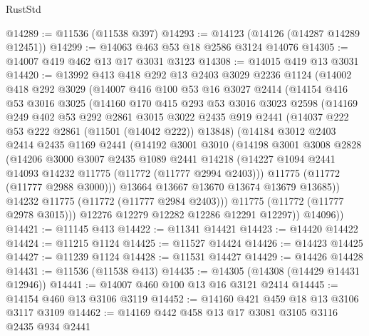 \begin{lexlean}{RustStd}
\begin{coremodule}
@14289 := @11536 (@11538 @397)
@14293 := @14123 (@14126 (@14287 @14289 @12451))
@14299 := @14063 @463 @53 @18 @2586 @3124 @14076
@14305 := @14007 @419 @462 @13 @17 @3031 @3123
@14308 := @14015 @419 @13 @3031
@14420 := @13992
    @413
    @418
    @292
    @13
    @2403
    @3029
    @2236
    @1124
    (@14002
      @418
      @292
      @3029
      (@14007
        @416
        @100
        @53
        @16
        @3027
        @2414
        (@14154
          @416
          @53
          @3016
          @3025
          (@14160
            @170
            @415
            @293
            @53
            @3016
            @3023
            @2598
            (@14169
              @249
              @402
              @53
              @292
              @2861
              @3015
              @3022
              @2435
              @919
              @2441
              (@14037 @222 @53 @222 @2861 (@11501 (@14042 @222)) @13848)
              (@14184
                @3012
                @2403
                @2414
                @2435
                @1169
                @2441
                (@14192
                  @3001
                  @3010
                  (@14198
                    @3001
                    @3008
                    @2828
                    (@14206
                      @3000
                      @3007
                      @2435
                      @1089
                      @2441
                      @14218
                      (@14227 @1094 @2441 @14093 @14232 @11775 (@11772 (@11777 @2994 @2403)))
                      @11775
                      (@11772 (@11777 @2988 @3000)))
                    @13664
                    @13667
                    @13670
                    @13674
                    @13679
                    @13685))
                @14232
                @11775
                (@11772 (@11777 @2984 @2403)))
              @11775
              (@11772 (@11777 @2978 @3015)))
            @12276
            @12279
            @12282
            @12286
            @12291
            @12297))
        @14096))
@14421 := @11145 @413
@14422 := @11341 @14421
@14423 := @14420 @14422
@14424 := @11215 @1124
@14425 := @11527 @14424
@14426 := @14423 @14425
@14427 := @11239 @1124
@14428 := @11531 @14427
@14429 := @14426 @14428
@14431 := @11536 (@11538 @413)
@14435 := @14305 (@14308 (@14429 @14431 @12946))
@14441 := @14007 @460 @100 @13 @16 @3121 @2414
@14445 := @14154 @460 @13 @3106 @3119
@14452 := @14160 @421 @459 @18 @13 @3106 @3117 @3109
@14462 := @14169 @442 @458 @13 @17 @3081 @3105 @3116 @2435 @934 @2441

\end{coremodule}
\end{lexlean}
